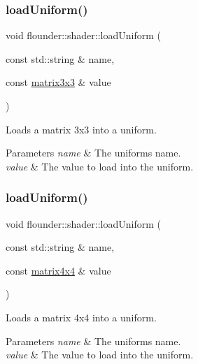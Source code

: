 \subsubsection{\texorpdfstring{load\+Uniform()}{loadUniform()}\hspace{0.1cm}{\footnotesize\ttfamily [9/13]}}
{\footnotesize\ttfamily void flounder\+::shader\+::load\+Uniform (\begin{DoxyParamCaption}\item[{const std\+::string \&}]{name,  }\item[{const \hyperlink{classflounder_1_1matrix3x3}{matrix3x3} \&}]{value }\end{DoxyParamCaption})}



Loads a matrix 3x3 into a uniform. 


\begin{DoxyParams}{Parameters}
{\em name} & The uniforms name. \\
\hline
{\em value} & The value to load into the uniform. \\
\hline
\end{DoxyParams}
\mbox{\label{classflounder_1_1shader_a2b7d1b32758e0aaefd20b050aeb2e7fe}} 
\subsubsection{\texorpdfstring{load\+Uniform()}{loadUniform()}\hspace{0.1cm}{\footnotesize\ttfamily [10/13]}}
{\footnotesize\ttfamily void flounder\+::shader\+::load\+Uniform (\begin{DoxyParamCaption}\item[{const std\+::string \&}]{name,  }\item[{const \hyperlink{classflounder_1_1matrix4x4}{matrix4x4} \&}]{value }\end{DoxyParamCaption})}



Loads a matrix 4x4 into a uniform. 


\begin{DoxyParams}{Parameters}
{\em name} & The uniforms name. \\
\hline
{\em value} & The value to load into the uniform. \\
\hline
\end{DoxyParams}
\mbox{\label{classflounder_1_1shader_a38aea3f31eb3f4b202bb9b519966c073}} 
